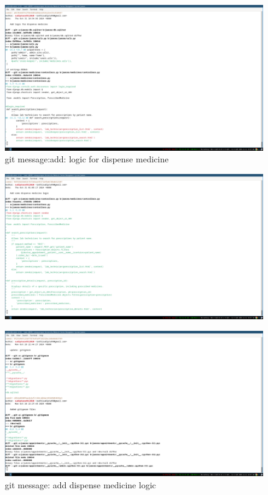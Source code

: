 \documentclass[a4paper,12pt]{article}
\begin{document}
\begin{figure}[H]
    \centering
    \includegraphics[width=\textwidth]{spr1meet36.png}
    \caption{git message:add: logic for dispense medicine}
\end{figure}


\begin{figure}[H]
    \centering
    \includegraphics[width=\textwidth]{spr1meet37.png}
    \caption{}
\end{figure}


\begin{figure}[H]
    \centering
    \includegraphics[width=\textwidth]{spr1meet38.png}
    \caption{git message: add dispense medicine logic}
\end{figure}
\end{document}
